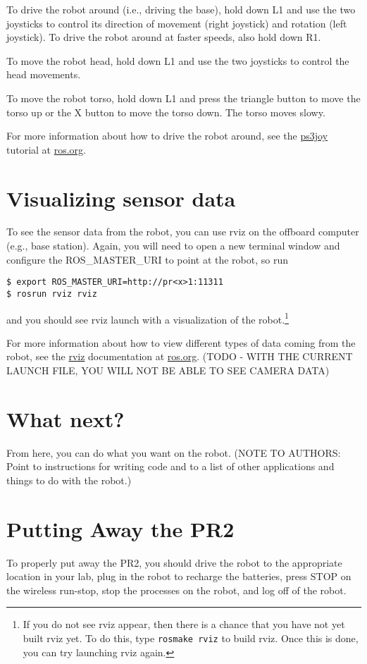 To drive the robot around (i.e., driving the base), hold down L1 and use the two joysticks to control its direction of movement (right joystick) and rotation (left joystick). To drive the robot around at faster speeds, also hold down R1.

To move the robot head, hold down L1 and use the two joysticks to control the head movements.

To move the robot torso, hold down L1 and press the triangle button to move the torso up or the X button to move the torso down. The torso moves slowy.

For more information about how to drive the robot around, see the 
\href{http://www.ros.org/wiki/ps3joy/Tutorials/UsingJoystickWithPR2}{ps3joy} tutorial at \href{http://www.ros.org}{ros.org}. 

\section{Visualizing sensor data}
To see the sensor data from the robot, you can use rviz on the offboard computer (e.g., base station).  Again, you will 
need to open a new terminal window and configure the ROS\_MASTER\_URI to point at the robot, so run
\begin{verbatim}
$ export ROS_MASTER_URI=http://pr<x>1:11311
$ rosrun rviz rviz
\end{verbatim}
and you should see rviz launch with a visualization of the robot.\footnote{If you do not see rviz appear, then there is a chance that you have not yet built rviz yet. To do this, type \texttt{rosmake rviz} to build rviz. Once this is done, you can try launching rviz again.}

For more information about how to view different types 
of data coming from the robot, see the \href{http://ros.org/wiki/rviz}{rviz} documentation at 
\href{http://www.ros.org}{ros.org}.
(TODO - WITH THE CURRENT LAUNCH FILE, YOU WILL NOT BE ABLE TO SEE CAMERA DATA)

\section{What next?}
From here, you can do what you want on the robot.  (NOTE TO AUTHORS: Point to instructions for writing code and to a list of other 
applications and things to do with the robot.)

\section{Putting Away the PR2}
To properly put away the PR2, you should drive the robot to the appropriate location in your lab, plug in the robot to recharge the batteries,
press STOP on the wireless run-stop, stop the processes on the robot, and log off of the robot.

